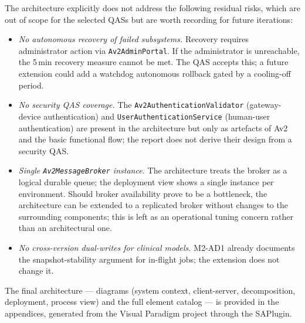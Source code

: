 The architecture explicitly does not address the following residual
risks, which are out of scope for the selected QASs but are worth
recording for future iterations:
\begin{itemize}
  \item \emph{No autonomous recovery of failed subsystems.} Recovery
        requires administrator action via \texttt{Av2AdminPortal}. If
        the administrator is unreachable, the 5\,min recovery measure
        cannot be met. The QAS accepts this; a future extension could
        add a watchdog autonomous rollback gated by a cooling-off
        period.
  \item \emph{No security QAS coverage.} The
        \texttt{Av2AuthenticationValidator} (gateway-device
        authentication) and \texttt{UserAuthenticationService}
        (human-user authentication) are present in the architecture but
        only as artefacts of Av2 and the basic functional flow; the
        report does not derive their design from a security QAS.
  \item \emph{Single \texttt{Av2MessageBroker} instance.} The
        architecture treats the broker as a logical durable queue; the
        deployment view shows a single instance per environment.
        Should broker availability prove to be a bottleneck, the
        architecture can be extended to a replicated broker without
        changes to the surrounding components; this is left as an
        operational tuning concern rather than an architectural one.
  \item \emph{No cross-version dual-writes for clinical models.}
        M2-AD1 already documents the snapshot-stability argument for
        in-flight jobs; the extension does not change it.
\end{itemize}

\bigskip
The final architecture --- diagrams (system context, client-server,
decomposition, deployment, process view) and the full element catalog
--- is provided in the appendices, generated from the Visual Paradigm
project through the SAPlugin.
